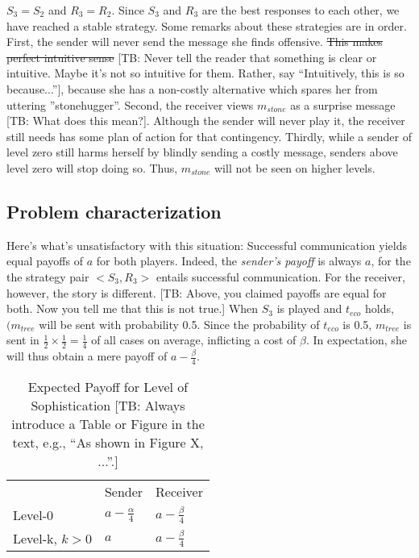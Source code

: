 \documentclass[10pt]{article}
\newcommand{\tb}[1]{\textcolor[rgb]{.8,.33,.0}{[TB: #1]}}%
\begin{document}
$S_3=S_2$ and $R_3=R_2$. Since $S_3$ and $R_3$ are the best responses to each other, we have reached a stable strategy.
Some remarks about these strategies are in order. First, the sender will never send the message she finds offensive. \sout{This makes perfect intuitive sense} \tb{Never tell the reader that something is clear or intuitive. Maybe it's not so intuitive for them. Rather, say ``Intuitively, this is so because...''}, because she has a non-costly alternative which spares her from uttering ''stonehugger''. Second, the receiver views $m_{stone}$ as a surprise message \tb{What does this mean?}. Although the sender will never play it, the receiver still needs has some plan of action for that contingency. Thirdly, while a sender of level zero still harms herself by blindly sending a costly message, senders above level zero will stop doing so. Thus, $m_{stone}$ will not be seen on higher levels.

\subsection{Problem characterization}
Here's what's unsatisfactory with this situation: Successful communication yields equal payoffs of $a$ for both players. Indeed, the \textit{sender's payoff} is always $a$, for the the strategy pair $<S_3,R_3>$ entails successful communication. For the receiver, however, the story is different. \tb{Above, you claimed payoffs are equal for both. Now you tell me that this is not true.} When $S_3$ is played and $t_{eco}$ holds, $(m_{tree}$ will be sent with probability 0.5. Since the probability of $t_{eco}$ is 0.5, $m_{tree}$ is sent in $\tfrac{1}{2}\times \tfrac{1}{2} = \tfrac{1}{4}$ of all cases on average, inflicting a cost of $\beta$. In expectation, she will thus obtain a mere payoff of $a-\tfrac{\beta}{4}$.

\begin{table}[h]
\centering
\caption{Expected Payoff for Level of Sophistication \tb{Always introduce a Table or Figure in the text, e.g., ``As shown in Figure X, ...''.}}
\begin{tabular}{lll}
                                    & Sender                                  & Receiver                                \\ \cline{2-3}
\multicolumn{1}{l|}{Level-0}        & \multicolumn{1}{l|}{$a-\tfrac{\alpha}{4}$} & \multicolumn{1}{l|}{$a-\tfrac{\beta}{4}$} \\ \cline{2-3}
\multicolumn{1}{l|}{Level-k, $k>0$} & \multicolumn{1}{l|}{$a$}                  & \multicolumn{1}{l|}{$a-\tfrac{\beta}{4}$} \\ \cline{2-3}
\end{tabular}
\end{table}
\end{document}
